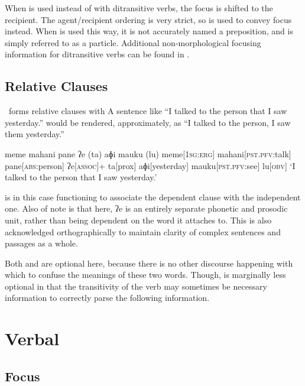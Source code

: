 
When  is used instead of  with ditransitive verbs, the focus is shifted to the recipient. The agent/recipient ordering is very strict, so  is used to convey focus instead. When  is used this way, it is not accurately named a preposition, and is simply referred to as a particle. Additional non-morphological focusing information for ditransitive verbs can be found in .

\section{Relative Clauses}

\langname\ forms relative clauses with  A sentence like ``I talked to the person that I saw yesterday.'' would be rendered, approximately, as ``I talked to the person, I saw them yesterday.''

\ex
\begingl
\glpreamble meme mahani pane ʔe (ta) aɸi mauku (lu)
\endpreamble
meme[\textsc{1sg:erg}]
mahani[\textsc{pst.pfv:}talk]
pane[\textsc{abs:}person]
ʔe[\textsc{assoc}]+
\nogloss{\lbrack}
ta[prox]
aɸi[yesterday]
mauku[\textsc{pst.pfv:}see]
lu[\textsc{obv}]
\nogloss{\rbrack}
\glft `I talked to the person that I saw yesterday.'
\endgl
\xe

 is in this case functioning to associate the dependent clause with the independent one. Also of note is that here, ʔe is an entirely separate phonetic and prosodic unit, rather than being dependent on the word it attaches to. This is also acknowledged orthographically to maintain clarity of complex sentences and passages as a whole.

Both  and  are optional here, because there is no other discourse happening with which to confuse the meanings of these two words. Though,  is marginally less optional in that the transitivity of the verb may sometimes be necessary information to correctly parse the following information.

\chapter{Verbal}

\section{Focus}\label{sec:focus}


